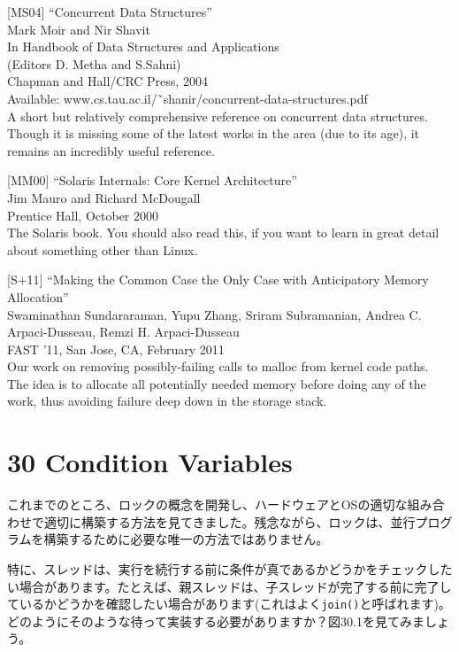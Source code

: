 {[}MS04{]} ``Concurrent Data Structures''\\
Mark Moir and Nir Shavit\\
In Handbook of Data Structures and Applications\\
(Editors D. Metha and S.Sahni)\\
Chapman and Hall/CRC Press, 2004\\
Available: www.cs.tau.ac.il/˜shanir/concurrent-data-structures.pdf\\
A short but relatively comprehensive reference on concurrent data
structures. Though it is missing some of the latest works in the area
(due to its age), it remains an incredibly useful reference.

{[}MM00{]} ``Solaris Internals: Core Kernel Architecture''\\
Jim Mauro and Richard McDougall\\
Prentice Hall, October 2000\\
The Solaris book. You should also read this, if you want to learn in
great detail about something other than Linux.

{[}S+11{]} ``Making the Common Case the Only Case with Anticipatory
Memory Allocation''\\
Swaminathan Sundararaman, Yupu Zhang, Sriram Subramanian, Andrea C.
Arpaci-Dusseau, Remzi H. Arpaci-Dusseau\\
FAST '11, San Jose, CA, February 2011\\
Our work on removing possibly-failing calls to malloc from kernel code
paths. The idea is to allocate all potentially needed memory before
doing any of the work, thus avoiding failure deep down in the storage
stack.

\newpage

\hypertarget{condition-variables-1}{%
\section*{30 Condition Variables}\label{condition-variables-1}}

これまでのところ、ロックの概念を開発し、ハードウェアとOSの適切な組み合わせで適切に構築する方法を見てきました。残念ながら、ロックは、並行プログラムを構築するために必要な唯一の方法ではありません。

特に、スレッドは、実行を続行する前に条件が真であるかどうかをチェックしたい場合があります。たとえば、親スレッドは、子スレッドが完了する前に完了しているかどうかを確認したい場合があります(これはよく\texttt{join()}と呼ばれます)。どのようにそのような待って実装する必要がありますか？図30.1を見てみましょう。

